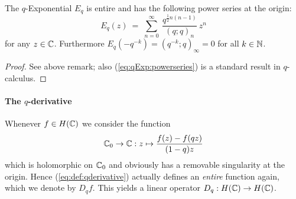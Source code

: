 \begin{prop_chp} \label{prop:def:qExp}
The\/ $q$-Exponential\/ $E_q$ is entire and has the following power series at the origin:
\begin{equation}\label{eq:qExp:powerseries}
  E_q(z)\:=\; \sum_{n=0}^\infty \:\frac{q^{\frac{1}{2}n(n-1)}}{(q;q)_n} \, z^n
\end{equation}
for any\/ $z\in \mathbb{C}$. Furthermore\/ $E_q(-q^{-k})=(q^{-k};q)_\infty=0$ for all\/ $k\in \mathbb{N}$.
\end{prop_chp}

\begin{proof}
See above remark; also (\ref{eq:qExp:powerseries}) is a standard result in $q$-calculus.
\end{proof}





\paragraph{The $q$-derivative}
Whenever $f \in H(\mathbb{C})$ we consider the function
\begin{equation}\label{eq:def:qderivative}
  \mathbb{C}_0 \rightarrow \mathbb{C} : z \mapsto \frac{f(z)-f(qz)}{(1-q)z}
\end{equation}
which is holomorphic on $\mathbb{C}_0$ and obviously has a removable
singularity at the origin. Hence (\ref{eq:def:qderivative})
actually defines an {\em entire\/} function again, which we denote
by $D_q f$. This yields a linear operator $D_q: H(\mathbb{C}) \rightarrow H(\mathbb{C})$.
